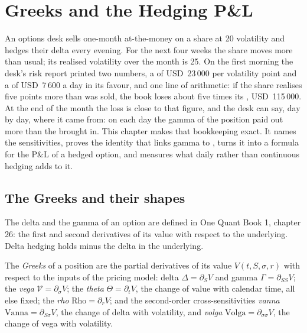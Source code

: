 \chapter{Greeks and the Hedging P\&L}\label{ch:dv:greeks-and-the-hedging-pnl}

An options desk sells one-month at-the-money  on a share at 20
volatility and hedges their delta every evening. For the next four weeks the
share moves more than usual; its realised volatility over the month is 25. On
the first morning the desk's risk report printed two numbers, a  of
USD~23\,000 per volatility point and a  of USD~7\,600 a day in its favour,
and one line of arithmetic: if the share realises five points more than was
sold, the book loses about five times its , USD~115\,000. At the end of the
month the loss is close to that figure, and the desk can say, day by day, where
it came from: on each day the gamma of the position paid out more than the
 brought in. This chapter makes that bookkeeping exact. It names the
sensitivities, proves the identity that links gamma to , turns it into a
formula for the P\&L of a hedged option, and measures what daily rather than
continuous hedging adds to it.

\section{The Greeks and their shapes}

The delta and the gamma of an option are defined in One Quant Book 1, chapter 26:
the first and second derivatives of its value with respect to the underlying.
Delta hedging holds minus the delta in the underlying.

\begin{definition}[Greeks]\label{def:dv:greeks-and-the-hedging-pnl:greeks}
The \emph{Greeks} of a position are the partial derivatives of its
value $V(t,S,\sigma,r)$ with respect to the inputs of the pricing model: delta
$\Delta=\partial_SV$ and gamma $\Gamma=\partial_{SS}V$; the \emph{vega}
$\mathcal V=\partial_\sigma V$; the \emph{theta} $\Theta=\partial_tV$, the
change of value with calendar time, all else fixed; the \emph{rho}
$\mathrm{Rho}=\partial_rV$; and the second-order cross-sensitivities
\emph{vanna} $\mathrm{Vanna}=\partial_{S\sigma}V$, the change of delta
with volatility, and \emph{volga} $\mathrm{Volga}=\partial_{\sigma\sigma}V$,
the change of vega with volatility.
\end{definition}

